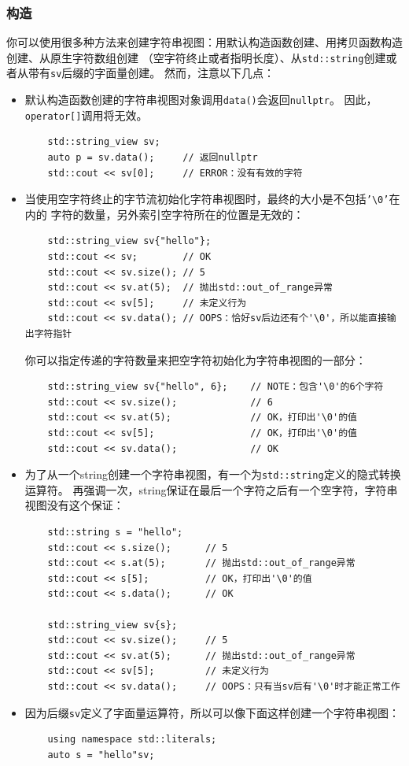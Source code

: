 \subsubsection{构造}
你可以使用很多种方法来创建字符串视图：用默认构造函数创建、用拷贝函数构造创建、从原生字符数组创建
（空字符终止或者指明长度）、从\texttt{std::string}创建或者从带有\texttt{sv}后缀的字面量创建。
然而，注意以下几点：
\begin{itemize}
    \item 默认构造函数创建的字符串视图对象调用\texttt{data()}会返回\texttt{nullptr}。
    因此，\texttt{operator[]}调用将无效。
    \begin{lstlisting}
    std::string_view sv;
    auto p = sv.data();     // 返回nullptr
    std::cout << sv[0];     // ERROR：没有有效的字符
    \end{lstlisting}
    \item 当使用空字符终止的字节流初始化字符串视图时，最终的大小是不包括\texttt{'\textbackslash 0'}在内的
    字符的数量，另外索引空字符所在的位置是无效的：
    \begin{lstlisting}
    std::string_view sv{"hello"};
    std::cout << sv;        // OK
    std::cout << sv.size(); // 5
    std::cout << sv.at(5);  // 抛出std::out_of_range异常
    std::cout << sv[5];     // 未定义行为
    std::cout << sv.data(); // OOPS：恰好sv后边还有个'\0'，所以能直接输出字符指针
    \end{lstlisting}
    你可以指定传递的字符数量来把空字符初始化为字符串视图的一部分：
    \begin{lstlisting}
    std::string_view sv{"hello", 6};    // NOTE：包含'\0'的6个字符
    std::cout << sv.size();             // 6
    std::cout << sv.at(5);              // OK，打印出'\0'的值
    std::cout << sv[5];                 // OK，打印出'\0'的值
    std::cout << sv.data();             // OK
    \end{lstlisting}
    \item 为了从一个string创建一个字符串视图，有一个为\texttt{std::string}定义的隐式转换运算符。
    再强调一次，string保证在最后一个字符之后有一个空字符，字符串视图没有这个保证：
    \begin{lstlisting}
    std::string s = "hello";
    std::cout << s.size();      // 5
    std::cout << s.at(5);       // 抛出std::out_of_range异常
    std::cout << s[5];          // OK，打印出'\0'的值
    std::cout << s.data();      // OK

    std::string_view sv{s};
    std::cout << sv.size();     // 5
    std::cout << sv.at(5);      // 抛出std::out_of_range异常
    std::cout << sv[5];         // 未定义行为
    std::cout << sv.data();     // OOPS：只有当sv后有'\0'时才能正常工作
    \end{lstlisting}
    \item 因为后缀\texttt{sv}定义了字面量运算符，所以可以像下面这样创建一个字符串视图：
    \begin{lstlisting}
    using namespace std::literals;
    auto s = "hello"sv;
    \end{lstlisting}
\end{itemize}
